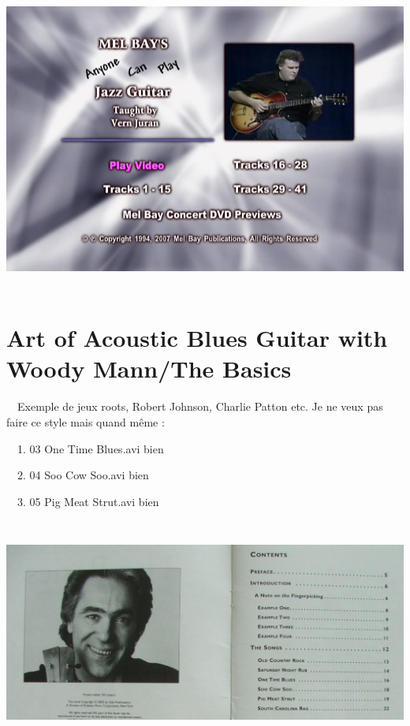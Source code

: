 \documentclass[a4paper]{book}
\begin{document}
\begin{center}
\includegraphics[width=15.023cm,height=10.015cm]{lebluessupportsmethodes-img45.jpg}
\end{center}

\clearpage\section[Art of Acoustic Blues Guitar with Woody Mann/The
Basics]{Art of Acoustic Blues Guitar with Woody Mann/The Basics}
\hypertarget{RefHeadingToc112973218262}{}\ \ Exemple de jeux roots,
Robert Johnson, Charlie Patton etc. Je ne veux pas faire ce style mais
quand m\^eme : 

\ \ 1. 03 One Time Blues.avi bien

\ \ 2. 04 Soo Cow Soo.avi bien

\ \ 3. 05 Pig Meat Strut.avi bien



\begin{center}
\includegraphics[width=17cm,height=7.479cm]{lebluessupportsmethodes-img46.png}
\end{center}
\end{document}
